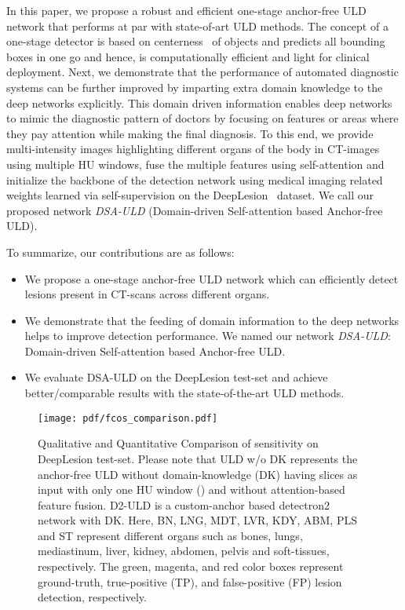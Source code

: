\documentclass{article}
\begin{document}
In this paper, we propose a robust and efficient one-stage anchor-free ULD network that performs at par with state-of-art ULD methods. The concept of a one-stage detector is based on centerness~\cite{tian2019fcos} of objects and predicts all bounding boxes in one go and hence, is computationally efficient and light for clinical deployment. Next, we demonstrate that the performance of automated diagnostic systems can be further improved by imparting extra domain knowledge to the deep networks explicitly. This domain driven information enables deep networks to mimic the diagnostic pattern of doctors by focusing on features or areas where they pay attention while making the final diagnosis. To this end, we provide multi-intensity images highlighting different organs of the body in CT-images using multiple HU windows, fuse the multiple features using self-attention and initialize the backbone of the detection network using medical imaging related weights learned via self-supervision on the DeepLesion~\cite{yan2018deeplesion} dataset. We call our proposed network \emph{DSA-ULD} (Domain-driven Self-attention based Anchor-free ULD).

To summarize, our contributions are as follows:
\begin{itemize}
    \item We propose a one-stage anchor-free ULD network which can efficiently detect lesions present in CT-scans across different organs.
    \item We demonstrate that the feeding of domain information to the deep networks helps to improve detection performance. We named our network \emph{DSA-ULD}: Domain-driven Self-attention based Anchor-free ULD.
    \item We evaluate DSA-ULD on the DeepLesion test-set and achieve better/comparable results with the state-of-the-art ULD methods.
\end{itemize}


\begin{figure*}[t]
  \centering
  \texttt{[image: pdf/fcos\_comparison.pdf]}
  \vspace{-2mm}
  \caption{\small{Qualitative and Quantitative Comparison of sensitivity on DeepLesion test-set. Please note that ULD w/o DK represents the anchor-free ULD without domain-knowledge (DK) having  slices as input with only one HU window () and without attention-based feature fusion. D2-ULD is a custom-anchor based detectron2 network with DK. Here, BN, LNG, MDT, LVR, KDY, ABM, PLS and ST represent different organs such as bones, lungs, mediastinum, liver, kidney, abdomen, pelvis and soft-tissues, respectively. The green, magenta, and red color boxes represent ground-truth, true-positive (TP), and false-positive (FP) lesion detection, respectively.
  }}
  \label{fig:lesion_size}
  \vspace{-2mm}
\end{figure*}
\vspace{-3mm}
\end{document}
